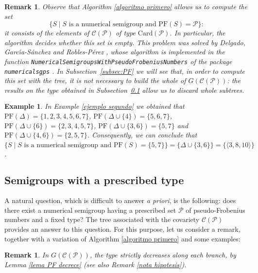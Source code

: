 \documentclass[11pt]{article}
\newtheorem{remark}[theorem]{Remark}
\newtheorem{example}[theorem]{Example}
\numberwithin{equation}{section}
\newcommand{\CP}{\mathcal C(\mathcal P)}
\newcommand{\PF}{\mathrm{PF}}
\newcommand{\NSPF}{\texttt{Numerical\-Semigroups\-With\-Pseudo\-Frobenius\-Numbers}}
\begin{document}
\begin{remark}\label{nota PF igual P}
    Observe that Algorithm \ref{algoritmo primero} allows us to compute the set
\[
\{S \mid S \text{ is a numerical semigroup and } \mathrm{PF}(S)=\mathcal{P}\}:
\]
it consists of the elements of $\CP$ of type $\mathrm{Card}(\mathcal P)$. In particular, the algorithm decides whether this set is empty. This problem was solved by Delgado, Garc\'{\i}a-S\'anchez and Robles-P\'erez \cite{delgado}, whose algorithm is implemented in the function \NSPF{} of the package \texttt{numericalsgps} \cite{numericalsgps-pkg,numericalsgps}. In Subsection~\ref{subsec:PF} we will see that, in order to compute this set with the tree, it is not necessary to build the whole of $G(\CP)$: the results on the type obtained in Subsection~\ref{subsec:type} allow us to discard whole subtrees.
\end{remark}

\begin{example}
    In Example \ref{ejemplo segundo} we obtained that $\mathrm{PF}(\Delta)=\{1,2,3,4,5,6,7\}$, $\mathrm{PF}(\Delta\cup\{4\})=\{5,6,7\}$, $\mathrm{PF}(\Delta\cup\{6\})=\{2,3,4,5,7\}$, $\mathrm{PF}(\Delta\cup\{3,6\})=\{5,7\}$ and $\PF(\Delta\cup\{4,6\})=\{2,5,7\}$. Consequently, we can conclude that $\{S\mid S\text{ is a numerical semigroup and } \PF(S)=\{5,7\}\}=\{\Delta\cup\{3,6\}\}=\{\langle 3,8,10\rangle\}$.
\end{example}

\subsection{\texorpdfstring{Semigroups with a prescribed type}{Semigroups with a prescribed type}}\label{subsec:type}

A natural question, which is difficult to answer \emph{a priori}, is the following: does there exist a numerical semigroup having a prescribed set $\mathcal{P}$ of pseudo-Frobenius numbers and a fixed type? The tree associated with the covariety $\mathcal{C}(\mathcal{P})$ provides an answer to this question. For this purpose, let us consider a remark, together with a variation of Algorithm \ref{algoritmo primero} and some examples:

\begin{remark}\label{nota tipo decrese}
    In $G(\mathcal{C}(\mathcal{P}))$, the type strictly decreases along each branch, by Lemma \ref{lema PF decrece} (see also Remark \ref{nota hipotesis}).
\end{remark}
\end{document}
